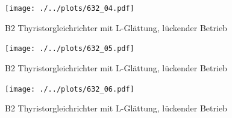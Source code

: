 \begin{figure}[h!]
    \centering
    \texttt{[image: ./../plots/632\_04.pdf]}
    \caption{B2 Thyristorgleichrichter mit L-Glättung, lückender Betrieb}
\end{figure}

\begin{figure}[h!]
    \centering
    \texttt{[image: ./../plots/632\_05.pdf]}
    \caption{B2 Thyristorgleichrichter mit L-Glättung, lückender Betrieb}
\end{figure}

\begin{figure}[h!]
    \centering
    \texttt{[image: ./../plots/632\_06.pdf]}
    \caption{B2 Thyristorgleichrichter mit L-Glättung, lückender Betrieb}
\end{figure}

\clearpage
